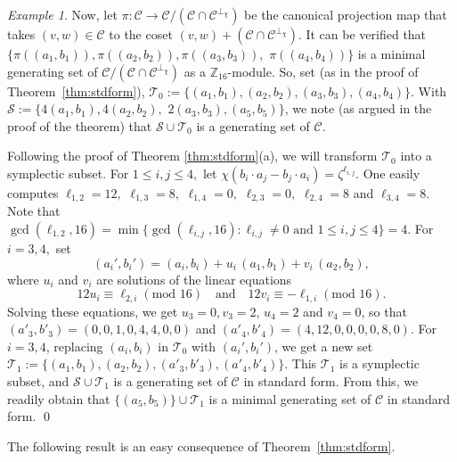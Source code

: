 \documentclass{article}
\DeclareMathOperator{\rank}{rank}
\theoremstyle{remark}
\newtheorem{ex}{Example}[section]
\theoremstyle{definition}
\numberwithin{equation}{section}
\begin{document}
\begin{ex}
  Now, let $\pi : \mathcal{C}  \to \mathcal{C}/(\mathcal{C} \cap \mathcal{C}^{\perp_\chi})$ be the canonical projection map that takes $(v,w) \in \mathcal{C}$ to the coset $(v,w) + (\mathcal{C} \cap \mathcal{C}^{\perp_\chi})$. It can be verified that $\{\pi((a_1,b_1)),\pi((a_2,b_2)), \pi((a_3,b_3)),$ $\pi((a_4,b_4)) \}$ is a minimal generating set of $\mathcal{C}/(\mathcal{C} \cap \mathcal{C}^{\perp_\chi})$ as a  $\mathbb{Z}_{16}$-module. So, set (as in the proof of Theorem~\ref{thm:stdform}), $\mathcal{T}_0:=\{(a_1,b_1),(a_2,b_2),(a_3,b_3),(a_4,b_4)\}$.  
 With $\mathcal{S}:=\{4(a_1,b_1),4(a_2,b_2), $ $2(a_3,b_3),(a_5,b_5)\}$, we note (as argued in the proof of the theorem) that $\mathcal{S} \cup \mathcal{T}_0$ is a generating set of $\mathcal{C}$. 
 
 Following the proof of Theorem \ref{thm:stdform}(a), we will transform $\mathcal{T}_0$ into a symplectic subset. For $1 \leq i,j \leq 4,$ let $\chi(b_i \cdot a_j-b_j \cdot a_i)=\zeta^{\ell_{i,j}}.$ One easily computes $\ell_{1,2}=12,$ $\ell_{1,3}=8,$  $\ell_{1,4}=0,$ $\ell_{2,3}=0,$ $\ell_{2,4}=8$ and $\ell_{3,4}=8.$ Note that $\gcd(\ell_{1,2},16)=\min\{\gcd(\ell_{i,j},16) : \ell_{i,j}\neq 0 \text{~and~} 1 \leq i,j \leq 4 \}=4.$ For $i =3,4,$ set
 $$(a_i',b_i')=(a_i,b_i) +u_i \, (a_1,b_1) + v_i \, (a_2,b_2),$$ 
 where $u_i$ and $v_i$ are solutions of the linear equations 
$$12u_i\equiv\ell_{2,i}(\text{mod~}16) \ \ \ \text{ and } \ \ \ 12v_i\equiv-\ell_{1,i}(\text{mod~}16).$$ Solving these equations, we get $u_3=0,v_3=2$, $u_4=2$ and $v_4=0$, so that $(a'_3,b'_3)=(0,0,1,0,4,4,0,0)$ and $(a'_4,b'_4)=(4,12,0,0,0,0,8,0)$. For $i = 3,4$, replacing $(a_i,b_i)$ in $\mathcal{T}_0$ with $(a_i',b_i')$, we get a new set $\mathcal{T}_1 :=\{(a_1,b_1),(a_2,b_2),(a'_3,b'_3),(a'_4,b'_4)\}$. This $\mathcal{T}_1$ is a symplectic subset, and $\mathcal{S} \cup \mathcal{T}_1$ is a generating set of $\mathcal{C}$ in standard form. From this, we readily obtain that $\{(a_5,b_5)\}  \cup \mathcal{T}_1$ is a minimal generating set of $\mathcal{C}$ in standard form.  \qed \end{ex}
  
  

The following result is an easy consequence of Theorem~\ref{thm:stdform}.
\end{document}
